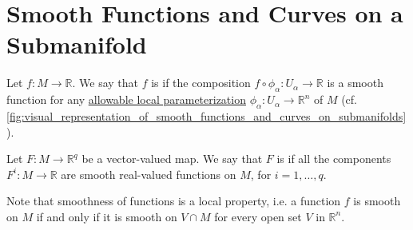 \documentclass[notoc,notitlepage]{tufte-book}
\begin{document}

\section{Smooth Functions and Curves on a Submanifold}%
\label{sec:smooth_functions_and_curves_on_a_submanifold}

\begin{defn}\label{defn:smooth_functions_on_submanifolds}
  Let $f : M \to \mathbb{R}$. We say that $f$ is  if the
  composition $f \circ \phi_\alpha : U_\alpha \to \mathbb{R}$ is a smooth
  function for any \hyperref[defn:local_parameterizations]{allowable local
  parameterization} $\phi_\alpha : U_\alpha \to \mathbb{R}^n$ of $M$ (cf.
  \cref{fig:visual_representation_of_smooth_functions_and_curves_on_submanifolds}).

  Let $F : M \to \mathbb{R}^q$ be a vector-valued map. We say that $F$ is
   if all the components $F^i : M \to \mathbb{R}$ are smooth
  real-valued functions on $M$, for $i = 1, \ldots, q$.
\end{defn}

\begin{remark}\label{remark:smoothness_as_a_local_property_on_submanifolds}
  Note that smoothness of functions is a local property, i.e. a function $f$ is
  smooth on $M$ if and only if it is smooth on $V \cap M$ for every open set $V$
  in $\mathbb{R}^n$.
\end{remark}
\end{document}

